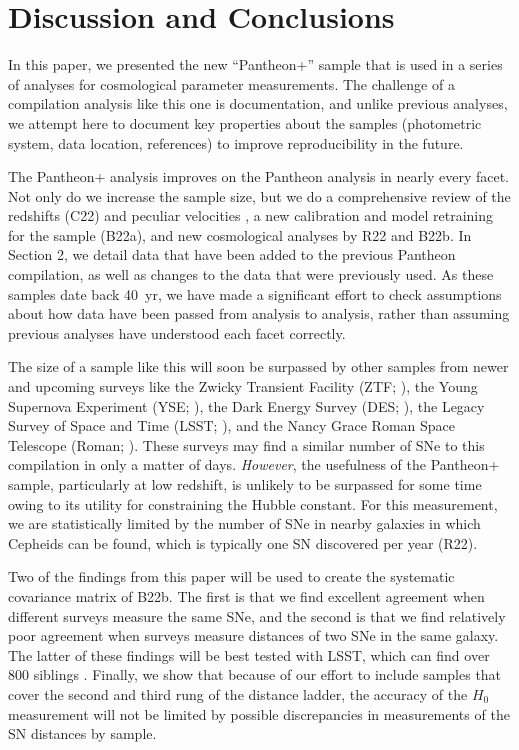 \documentclass[twocolumn]{aastex63}
\begin{document}
\section{Discussion and Conclusions}

In this paper, we presented the new ``Pantheon+'' sample that is used in a series of analyses for cosmological parameter measurements.  The challenge of a compilation analysis like this one is documentation, and unlike previous analyses, we attempt here to document key properties about the samples (photometric system, data location, references) to improve reproducibility in the future.

The Pantheon+ analysis improves on the Pantheon analysis in nearly every facet.  Not only do we increase the sample size, but we do a comprehensive review of the redshifts (C22) and peculiar velocities \citep{Peterson2021}, a new calibration and model retraining for the sample (B22a), and new cosmological analyses by R22 and B22b.  In Section 2, we detail data that have been added to the previous Pantheon compilation, as well as changes to the data that were previously used.  As these samples date back 40~yr, we have made a significant effort to check assumptions about how data have been passed from analysis to analysis, rather than assuming previous analyses have understood each facet correctly.

The size of a sample like this will soon be surpassed by other samples from newer and upcoming surveys like the Zwicky Transient Facility (ZTF; \citealp{dhawan21}), the Young Supernova Experiment (YSE; \citealp{jones21}), the Dark Energy Survey (DES; \citealp{Smith2020}), the Legacy Survey of Space and Time (LSST; \citealp{zeljko19}), and the Nancy Grace Roman Space Telescope (Roman; \citealp{Hounsell18}). These surveys may find a similar number of SNe to this compilation in only a matter of days.  {\it However}, the usefulness of the Pantheon+ sample, particularly at low redshift, is unlikely to be surpassed for some time owing to its utility for constraining the Hubble constant.  For this measurement, we are statistically limited by the number of SNe in nearby galaxies in which Cepheids can be found, which is typically one SN discovered per year (R22).  

Two of the findings from this paper will be used to create the systematic covariance matrix of B22b.  The first is that we find excellent agreement when different surveys measure the same SNe, and the second is that we find relatively poor agreement when surveys measure distances of two SNe in the same galaxy.  The latter of these findings will be best tested with LSST, which can find over 800 siblings \citep{Mandelbaum18,Scolnic20}.  Finally, we show that because of our effort to include samples that cover the second and third rung of the distance ladder, the accuracy of the $H_0$ measurement will not be limited by possible discrepancies in measurements of the SN distances by sample.
\end{document}

